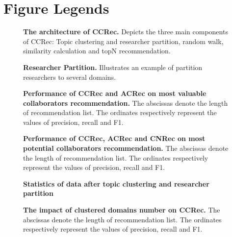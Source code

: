 \section*{Figure Legends}
%

\begin{figure}[!hbt]
\caption{{\bf The architecture of CCRec.} Depicts the three main components of CCRec: Topic clustering and researcher partition, random walk, similarity calculation and topN recommendation.}
\label{fig:fig1}
\end{figure}

\begin{figure}[!hbt]
\caption{{\bf Researcher Partition.} Illustrates an example of partition researchers to several domains.}
\label{fig:fig2}
\end{figure}

\begin{figure}[!hbt]
\caption{{\bf Performance of CCRec and ACRec on most valuable collaborators recommendation.} The abscissas denote the length of recommendation list. The ordinates respectively represent the values of precision, recall and F1.}
\label{fig:fig3}
\end{figure}

\begin{figure}[!hbt]
\caption{{\bf Performance of CCRec, ACRec and CNRec on most potential collaborators recommendation.} The abscissas denote the length of recommendation list. The ordinates respectively represent the values of precision, recall and F1.}
\label{fig:fig4}
\end{figure}

\begin{figure}[!hbt]
\caption{{\bf Statistics of data after topic clustering and researcher partition}}
\label{fig:fig5}
\end{figure}

\begin{figure}[!hbt]
\caption{{\bf The impact of clustered domains number on CCRec.} The abscissas denote the length of recommendation list. The ordinates respectively represent the values of precision, recall and F1.}
\label{fig:fig6}
\end{figure}

